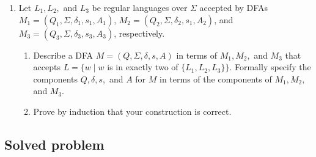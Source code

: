 \documentclass[11pt]{article}
\begin{document}
\begin{enumerate}

\item Let $L_1, L_2,$ and $L_3$ be regular languages over $\Sigma$
  accepted by DFAs $M_1 = (Q_1, \Sigma, \delta_1, s_1, A_1)$,
  $M_2 = (Q_2, \Sigma, \delta_2, s_1, A_2)$, and $M_3 = (Q_3,
  \Sigma, \delta_3, s_3, A_3)$, respectively.

\begin{enumerate}
\item Describe a DFA $M = (Q, \Sigma, \delta, s, A)$ in terms of $M_1,
  M_2,$ and $M_3$ that accepts $L = \{w \mid w$ is in exactly two of
  $\{L_1, L_2, L_3\}\}.$ Formally specify the components $Q, \delta,
  s,$ and $A$ for $M$ in terms of the components of $M_1, M_2,$ and
  $M_3$.
\item Prove by induction that your construction is correct.
\end{enumerate}


\end{enumerate}
\newpage
\subsection*{Solved problem}
\end{document}
